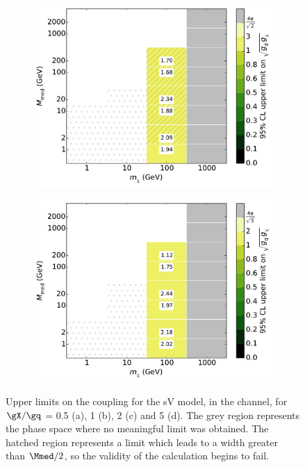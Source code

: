 \begin{figure}[h]
\begin{subfigure}[t]{0.495\textwidth}
      \includegraphics[width=1.\textwidth]{figures/grid_basepoints_SVD_rat2_monoWZ.pdf}
      \caption{}
    \end{subfigure}
    \begin{subfigure}[t]{0.495\textwidth}
      \centering
      \includegraphics[width=1.\textwidth]{figures/grid_basepoints_SVD_rat5_monoWZ.pdf}
      \caption{}
    \end{subfigure}
    \caption{Upper limits on the coupling for the sV model, in the \monoWZ channel, for $\gX / \gq$ = 0.5 (a), 1 (b), 2 (c) and 5 (d). The grey region represents the phase space where no meaningful limit was obtained. The hatched region represents a limit which leads to a width greater than $\Mmed / 2$, so the validity of the calculation begins to fail.}
    \label{fig:MonoWZ_SVD_couplinglimit}
\end{figure}

